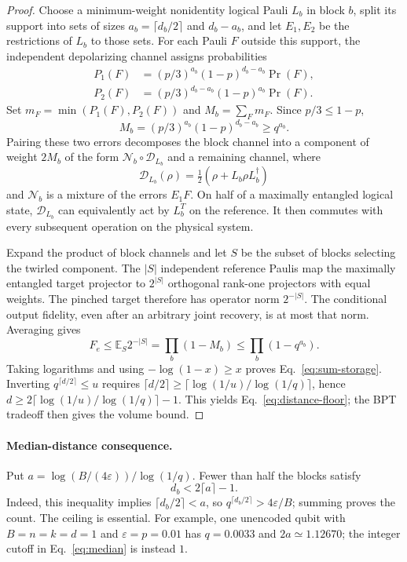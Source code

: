 \documentclass[aps,prx,reprint,superscriptaddress,nofootinbib,floatfix,longbibliography]{revtex4-2}
\theoremstyle{definition}
\begin{document}
\begin{proof}
Choose a minimum-weight nonidentity logical Pauli $L_b$ in block $b$, split its support into sets of sizes $a_b=\lceil d_b/2\rceil$ and $d_b-a_b$, and let $E_1,E_2$ be the restrictions of $L_b$ to those sets. For each Pauli $F$ outside this support, the independent depolarizing channel assigns probabilities
\begin{align}
 P_1(F)&=(p/3)^{a_b}(1-p)^{d_b-a_b}\Pr(F),\\
 P_2(F)&=(p/3)^{d_b-a_b}(1-p)^{a_b}\Pr(F).
\end{align}
Set $m_F=\min(P_1(F),P_2(F))$ and $M_b=\sum_F m_F$. Since $p/3\leq1-p$,
\begin{equation}
 M_b=(p/3)^{a_b}(1-p)^{d_b-a_b}\geq q^{a_b}.
\end{equation}
Pairing these two errors decomposes the block channel into a component of weight $2M_b$ of the form $\mathcal N_b\circ\mathcal D_{L_b}$ and a remaining channel, where
\begin{equation}
 \mathcal D_{L_b}(\rho)=\tfrac12(\rho+L_b\rho L_b^\dagger)
\end{equation}
and $\mathcal N_b$ is a mixture of the errors $E_1F$. On half of a maximally entangled logical state, $\mathcal D_{L_b}$ can equivalently act by $L_b^T$ on the reference. It then commutes with every subsequent operation on the physical system.

Expand the product of block channels and let $S$ be the subset of blocks selecting the twirled component. The $|S|$ independent reference Paulis map the maximally entangled target projector to $2^{|S|}$ orthogonal rank-one projectors with equal weights. The pinched target therefore has operator norm $2^{-|S|}$. The conditional output fidelity, even after an arbitrary joint recovery, is at most that norm. Averaging gives
\begin{equation}
 F_e\leq\mathbb E_S 2^{-|S|}=\prod_b(1-M_b)\leq\prod_b(1-q^{a_b}).
\end{equation}
Taking logarithms and using $-\log(1-x)\geq x$ proves Eq.~\eqref{eq:sum-storage}. Inverting $q^{\lceil d/2\rceil}\leq u$ requires $\lceil d/2\rceil\geq\lceil\log(1/u)/\log(1/q)\rceil$, hence $d\geq2\lceil\log(1/u)/\log(1/q)\rceil-1$. This yields Eq.~\eqref{eq:distance-floor}; the BPT tradeoff then gives the volume bound.
\end{proof}

\paragraph{Median-distance consequence.}
Put $a=\log(B/(4\varepsilon))/\log(1/q)$. Fewer than half the blocks satisfy
\begin{equation}
 d_b<2\lceil a\rceil-1.
 \label{eq:median}
\end{equation}
Indeed, this inequality implies $\lceil d_b/2\rceil<a$, so $q^{\lceil d_b/2\rceil}>4\varepsilon/B$; summing proves the count. The ceiling is essential. For example, one unencoded qubit with $B=n=k=d=1$ and $\varepsilon=p=0.01$ has $q=0.0033$ and $2a\simeq1.12670$; the integer cutoff in Eq.~\eqref{eq:median} is instead $1$.
\end{document}
